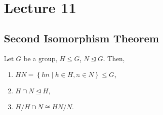 \section{Lecture 11}
\subsection{Second Isomorphism Theorem}
\begin{theorem}
  Let $G$ be a group, $H \leq G$, $N\trianglelefteq G$. Then,
  \begin{enumerate}
    \item $HN=\left\{ hn \mid h\in H,n\in N \right\} \leq G$,
    \item $H\cap N \trianglelefteq H$,
    \item $H/H\cap N \cong HN/N$.
  \end{enumerate}
  \label{secondIso}
\end{theorem}
